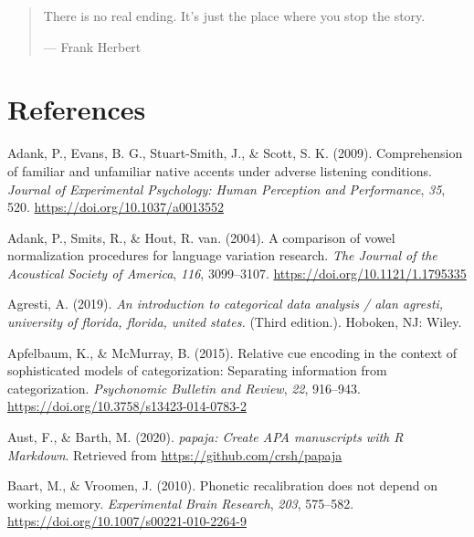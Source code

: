 \documentclass[
  11pt,
  english,
  man,floatsintext]{apa6}
\newlength{\cslhangindent}
\newlength{\cslentryspacingunit} %
\newenvironment{CSLReferences}[2] %
 {%
  \setlength{\parindent}{0pt}
  \ifodd #1
  \let\oldpar\par
  \def\par{\hangindent=\cslhangindent\oldpar}
  \fi
  \setlength{\parskip}{#2\cslentryspacingunit}
 }%
 {}
\begin{document}
\begin{quote}
There is no real ending. It's just the place where you stop the story.

\hfill --- Frank Herbert
\end{quote}

\newpage

\hypertarget{references}{%
\section{References}\label{references}}

\begingroup
\setlength{\parindent}{-0.5in}
\setlength{\leftskip}{0.5in}

\hypertarget{refs}{}
\begin{CSLReferences}{1}{0}
\leavevmode{}%
Adank, P., Evans, B. G., Stuart-Smith, J., \& Scott, S. K. (2009). Comprehension of familiar and unfamiliar native accents under adverse listening conditions. \emph{Journal of Experimental Psychology: Human Perception and Performance}, \emph{35}, 520. \url{https://doi.org/10.1037/a0013552}

\leavevmode{}%
Adank, P., Smits, R., \& Hout, R. van. (2004). A comparison of vowel normalization procedures for language variation research. \emph{The Journal of the Acoustical Society of America}, \emph{116}, 3099--3107. \url{https://doi.org/10.1121/1.1795335}

\leavevmode{}%
Agresti, A. (2019). \emph{An introduction to categorical data analysis / alan agresti, university of florida, florida, united states.} (Third edition.). Hoboken, NJ: Wiley.

\leavevmode{}%
Apfelbaum, K., \& McMurray, B. (2015). Relative cue encoding in the context of sophisticated models of categorization: Separating information from categorization. \emph{Psychonomic Bulletin and Review}, \emph{22}, 916--943. \url{https://doi.org/10.3758/s13423-014-0783-2}

\leavevmode{}%
Aust, F., \& Barth, M. (2020). \emph{{papaja}: {Create} {APA} manuscripts with {R Markdown}}. Retrieved from \url{https://github.com/crsh/papaja}

\leavevmode{}%
Baart, M., \& Vroomen, J. (2010). Phonetic recalibration does not depend on working memory. \emph{Experimental Brain Research}, \emph{203}, 575--582. \url{https://doi.org/10.1007/s00221-010-2264-9}


\end{CSLReferences}
\end{document}
